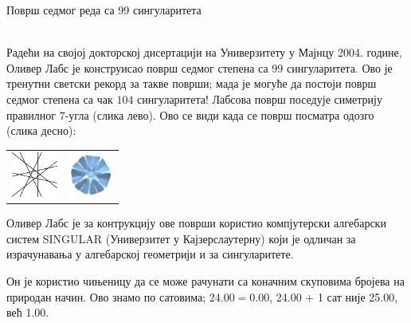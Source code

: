 \documentclass[sr]{./../../common/SurferDesc}%
\begin{document}
\footnotesize


\begin{surferPage}
  \begin{surferTitle}Површ седмог реда са 99 сингуларитета\end{surferTitle}   \\
  
    Радећи на својој докторској дисертацији на Универзитету у Мајнцу 2004. године, 
	Оливер Лабс је конструисао површ седмог степена са 99 сингуларитета. 
	Ово је тренутни светски рекорд за такве површи; мада је могуће да постоји површ 
	седмог степена са чак $104$ сингуларитета!  
    Лабсова површ поседује симетрију правилног $7$-угла (слика лево).
    Ово се види када се површ посматра одозго (слика десно):

    \vspace*{-0.3em}
    \begin{center}
      \begin{tabular}{c@{\qquad}c}
        \includegraphics[height=1.5cm]{./../../common/images/labsseptic1.pdf}
        &
        \includegraphics[height=1.5cm]{./../../common/images/labs_septic_von_oben}
      \end{tabular}
    \end{center}
    \vspace*{-0.3em}

    Оливер Лабс је за контрукцију ове површи користио компјутерски алгебарски систем 
    {\sc SINGULAR} (Универзитет у Кајзерслаутерну) који је одличан за израчунавања у 
	алгебарској геометрији и за сингуларитете.

    Он је користио чињеницу да се може рачунати са коначним скуповима бројева на 
    природан начин. Ово знамо по сатовима; 24.00$=$0.00, 24.00 $+$ 1 сат није
    25.00, већ 1.00.

     
\end{surferPage}
\end{document}
